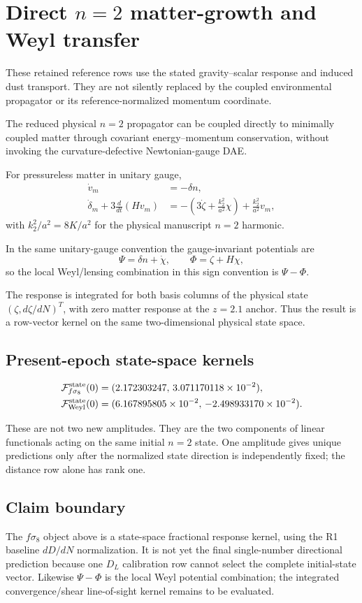 \section{Direct $n=2$ matter-growth and Weyl transfer}

These retained reference rows use the stated gravity--scalar response and
induced dust transport. They are not silently replaced by the coupled
environmental propagator or its reference-normalized momentum coordinate.
\label{sec:r1-n2-growth-lensing-transfer}

The reduced physical $n=2$ propagator can be coupled directly to minimally coupled matter through covariant energy--momentum conservation, without invoking the curvature-defective Newtonian-gauge DAE.

For pressureless matter in unitary gauge,
\begin{align}
\dot v_m&=-\delta n,\\
\dot\delta_m+3\frac{d}{dt}(Hv_m)&=-\left(3\dot\zeta+\frac{k_2^2}{a^2}\chi\right)+\frac{k_2^2}{a^2}v_m,
\end{align}
with $k_2^2/a^2=8K/a^2$ for the physical manuscript $n=2$ harmonic.

In the same unitary-gauge convention the gauge-invariant potentials are
\begin{equation}
\Psi=\delta n+\dot\chi,\qquad\Phi=\zeta+H\chi,
\end{equation}
so the local Weyl/lensing combination in this sign convention is $\Psi-\Phi$.

The response is integrated for both basis columns of the physical state $(\zeta,d\zeta/dN)^T$, with zero matter response at the $z=2.1$ anchor.  Thus the result is a row-vector kernel on the same two-dimensional physical state space.

\subsection{Present-epoch state-space kernels}
\begin{align}
\mathcal F^{\rm state}_{f\sigma_8}(0)&=(2.172303247,\,3.071170118\times10^{-2}),\\
\mathcal F^{\rm state}_{\rm Weyl}(0)&=(6.167895805\times10^{-2},\,-2.498933170\times10^{-2}).
\end{align}

These are not two new amplitudes.  They are the two components of linear functionals acting on the same initial $n=2$ state.  One amplitude gives unique predictions only after the normalized state direction is independently fixed; the distance row alone has rank one.

\subsection{Claim boundary}
The $f\sigma_8$ object above is a state-space fractional response kernel, using the R1 baseline $dD/dN$ normalization.  It is not yet the final single-number directional prediction because one $D_L$ calibration row cannot select the complete initial-state vector.
Likewise $\Psi-\Phi$ is the local Weyl potential combination; the integrated convergence/shear line-of-sight kernel remains to be evaluated.
